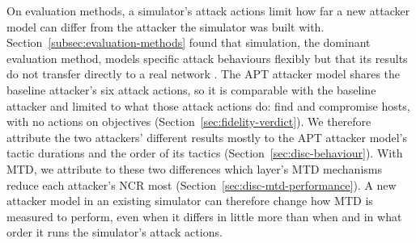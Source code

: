 \documentclass{cshonours}
\begin{document}
On evaluation methods, a simulator's attack actions limit how far a new
attacker model can differ from the attacker the simulator was built with.
Section~\ref{subsec:evaluation-methods} found that simulation, the dominant
evaluation method, models specific attack behaviours flexibly but that its
results do not transfer directly to a real network \citep{cho2020}. The APT
attacker model shares the baseline attacker's six attack actions, so it is
comparable with the baseline attacker and limited to what those attack actions
do: find and compromise hosts, with no actions on objectives
(Section~\ref{sec:fidelity-verdict}). We therefore attribute the two
attackers' different results mostly to the APT attacker model's tactic
durations and the order of its tactics (Section~\ref{sec:disc-behaviour}).
With MTD, we attribute to these two differences which layer's MTD mechanisms reduce
each attacker's NCR most (Section~\ref{sec:disc-mtd-performance}). A new attacker
model in an existing simulator can therefore change how MTD is measured to perform, even when
it differs in little more than when and in what order it runs the simulator's
attack actions.


\end{document}
